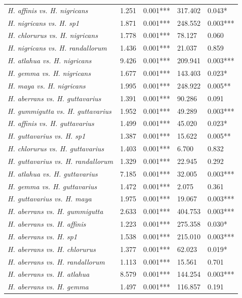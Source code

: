 \begin{xltabular}{\textwidth}{p{4.5cm}*{4}{X}}
\emph{H. affinis vs. H. nigricans} & 1.251 & 0.001*** & 317.402 & 0.043* \\
\emph{H. nigricans vs. H. sp1} & 1.871 & 0.001*** & 248.552 & 0.003*** \\
\emph{H. chlorurus vs. H. nigricans} & 1.778 & 0.001*** & 78.127 & 0.060 \\
\emph{H. nigricans vs. H. randallorum} & 1.436 & 0.001*** & 21.037 & 0.859 \\
\emph{H. atlahua vs. H. nigricans} & 9.426 & 0.001*** & 209.941 & 0.003*** \\
\emph{H. gemma vs. H. nigricans} & 1.677 & 0.001*** & 143.403 & 0.023* \\
\emph{H. maya vs. H. nigricans} & 1.995 & 0.001*** & 248.922 & 0.005** \\
\emph{H. aberrans vs. H. guttavarius} & 1.391 & 0.001*** & 90.286 & 0.091 \\
\emph{H. gummigutta vs. H. guttavarius} & 1.952 & 0.001*** & 49.289 & 0.003*** \\
\emph{H. affinis vs. H. guttavarius} & 1.499 & 0.001*** & 45.020 & 0.023* \\
\emph{H. guttavarius vs. H. sp1} & 1.387 & 0.001*** & 15.622 & 0.005** \\
\emph{H. chlorurus vs. H. guttavarius} & 1.403 & 0.001*** & 6.700 & 0.832 \\
\emph{H. guttavarius vs. H. randallorum} & 1.329 & 0.001*** & 22.945 & 0.292 \\
\emph{H. atlahua vs. H. guttavarius} & 7.185 & 0.001*** & 32.005 & 0.003*** \\
\emph{H. gemma vs. H. guttavarius} & 1.472 & 0.001*** & 2.075 & 0.361 \\
\emph{H. guttavarius vs. H. maya} & 1.975 & 0.001*** & 19.067 & 0.003*** \\
\emph{H. aberrans vs. H. gummigutta} & 2.633 & 0.001*** & 404.753 & 0.003*** \\
\emph{H. aberrans vs. H. affinis} & 1.223 & 0.001*** & 275.358 & 0.030* \\
\emph{H. aberrans vs. H. sp1} & 1.538 & 0.001*** & 215.010 & 0.003*** \\
\emph{H. aberrans vs. H. chlorurus} & 1.377 & 0.001*** & 62.023 & 0.019* \\
\emph{H. aberrans vs. H. randallorum} & 1.113 & 0.001*** & 15.561 & 0.701 \\
\emph{H. aberrans vs. H. atlahua} & 8.579 & 0.001*** & 144.254 & 0.003*** \\
\emph{H. aberrans vs. H. gemma} & 1.497 & 0.001*** & 116.857 & 0.191 \\

\end{xltabular}
